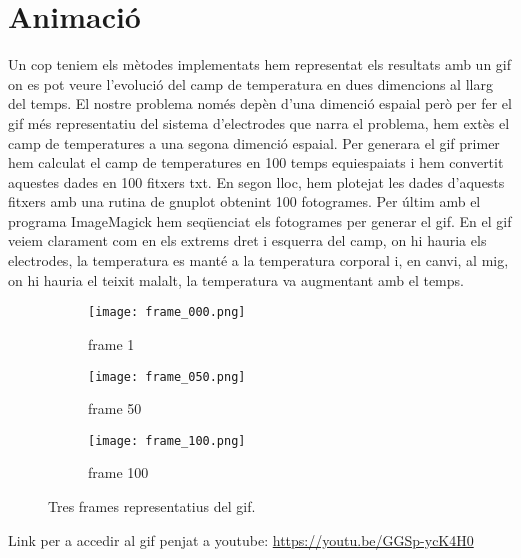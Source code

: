 \documentclass[11pt]{article}
\begin{document}
\section{Animació}
Un cop teniem els mètodes implementats hem representat els resultats amb un gif on es pot veure l'evolució del camp de temperatura en dues dimencions al llarg del temps. El nostre problema només depèn d'una dimenció espaial però per fer el gif més representatiu del sistema d'electrodes que narra el problema, hem extès el camp de temperatures a una segona dimenció espaial. 
Per generara el gif primer hem calculat el camp de temperatures en 100 temps equiespaiats i hem convertit aquestes dades en 100 fitxers txt. En segon lloc, hem plotejat les dades d'aquests fitxers amb una rutina de gnuplot obtenint 100 fotogrames. Per últim amb el programa ImageMagick hem seqüenciat els fotogrames per generar el gif.
En el gif veiem clarament com en els extrems dret i esquerra del camp, on hi hauria els electrodes, la temperatura es manté a la temperatura corporal i, en canvi, al mig, on hi hauria el teixit malalt, la temperatura va augmentant amb el temps.



\begin{figure}[hbt!]
    \centering
    \begin{subfigure}{0.3\textwidth}
        \centering
        \texttt{[image: frame\_000.png]}
        \caption{frame 1}
    \end{subfigure}%
    \hspace{0.01\textwidth}%
    \begin{subfigure}{0.3\textwidth}
        \centering
        \texttt{[image: frame\_050.png]}
        \caption{frame 50}
    \end{subfigure}
    \hspace{0.01\textwidth}
    \begin{subfigure}{0.3\textwidth}
        \centering
        \texttt{[image: frame\_100.png]}
        \caption{frame 100}
    \end{subfigure}

    \caption{Tres frames representatius del gif.}
    \label{fig:dues_imatges}
\end{figure}

Link per a accedir al gif penjat a youtube: \url{https://youtu.be/GGSp-ycK4H0}
\end{document}
